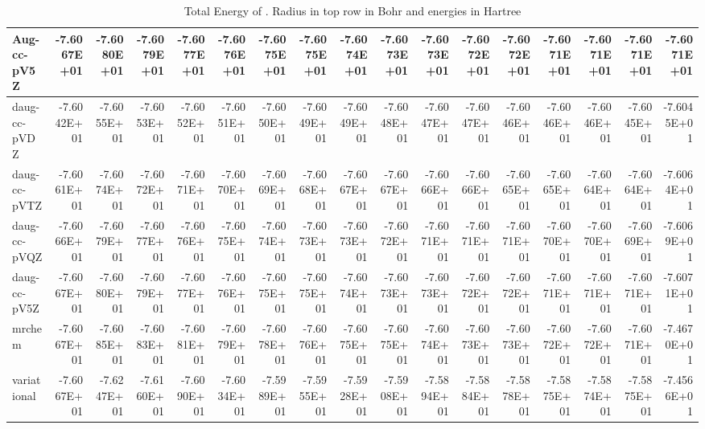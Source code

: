 \documentclass[../master_thesis.tex]{subfiles}
\begin{document}
\begin{table}
{{\begin{tabular}{|l|r|r|r|r|r|r|r|r|r|r|r|r|r|r|r|r|}
    Aug-cc-pV5Z & -7.6067E+01 & -7.6080E+01 & -7.6079E+01 & -7.6077E+01 & -7.6076E+01 & -7.6075E+01 & -7.6075E+01 & -7.6074E+01 & -7.6073E+01 & -7.6073E+01 & -7.6072E+01 & -7.6072E+01 & -7.6071E+01 & -7.6071E+01 & -7.6071E+01 & -7.6071E+01  \\ \hline
    daug-cc-pVDZ & -7.6042E+01 & -7.6055E+01 & -7.6053E+01 & -7.6052E+01 & -7.6051E+01 & -7.6050E+01 & -7.6049E+01 & -7.6049E+01 & -7.6048E+01 & -7.6047E+01 & -7.6047E+01 & -7.6046E+01 & -7.6046E+01 & -7.6046E+01 & -7.6045E+01 & -7.6045E+01  \\ \hline
    daug-cc-pVTZ & -7.6061E+01 & -7.6074E+01 & -7.6072E+01 & -7.6071E+01 & -7.6070E+01 & -7.6069E+01 & -7.6068E+01 & -7.6067E+01 & -7.6067E+01 & -7.6066E+01 & -7.6066E+01 & -7.6065E+01 & -7.6065E+01 & -7.6064E+01 & -7.6064E+01 & -7.6064E+01  \\ \hline
    daug-cc-pVQZ & -7.6066E+01 & -7.6079E+01 & -7.6077E+01 & -7.6076E+01 & -7.6075E+01 & -7.6074E+01 & -7.6073E+01 & -7.6073E+01 & -7.6072E+01 & -7.6071E+01 & -7.6071E+01 & -7.6071E+01 & -7.6070E+01 & -7.6070E+01 & -7.6069E+01 & -7.6069E+01 \\ \hline
    daug-cc-pV5Z & -7.6067E+01 & -7.6080E+01 & -7.6079E+01 & -7.6077E+01 & -7.6076E+01 & -7.6075E+01 & -7.6075E+01 & -7.6074E+01 & -7.6073E+01 & -7.6073E+01 & -7.6072E+01 & -7.6072E+01 & -7.6071E+01 & -7.6071E+01 & -7.6071E+01 & -7.6071E+01 \\ \hline
    mrchem & -7.6067E+01 & -7.6085E+01 & -7.6083E+01 & -7.6081E+01 & -7.6079E+01 & -7.6078E+01 & -7.6076E+01 & -7.6075E+01 & -7.6075E+01 & -7.6074E+01 & -7.6073E+01 & -7.6073E+01 & -7.6072E+01 & -7.6072E+01 & -7.6071E+01 & -7.4670E+01  \\ \hline
    variational & -7.6067E+01 & -7.6247E+01 & -7.6160E+01 & -7.6090E+01 & -7.6034E+01 & -7.5989E+01 & -7.5955E+01 & -7.5928E+01 & -7.5908E+01 & -7.5894E+01 & -7.5884E+01 & -7.5878E+01 & -7.5875E+01 & -7.5874E+01 & -7.5875E+01 & -7.4566E+01  \\ \hline
  \end{tabular}}}{\caption{Total Energy of . Radius in top row in Bohr and energies in Hartree}
  \label{tab:rawwatdata}}

\ttabbox{

}
\end{table}
\end{document}

